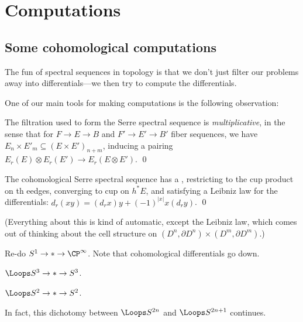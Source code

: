 
\chapter{Computations}




\section{Some cohomological computations}

The fun of spectral sequences in topology is that we don't just filter our problems away into differentials---we then try to compute the differentials.

One of our main tools for making computations is the following observation:
\begin{lemma}
The filtration used to form the Serre spectral sequence is \emph{multiplicative}, in the sense that for $F \to E \to B$ and $F' \to E' \to B'$ fiber sequences, we have $E_n \times E'_m \subseteq (E \times E')_{n+m}$, inducing a pairing $E_r(E) \otimes E_r(E') \to E_r(E \otimes E')$. \qed
\end{lemma}

\begin{corollary}
The cohomological Serre spectral sequence has a , restricting to the cup product on th eedges, converging to cup on $h^* E$, and satisfying a Leibniz law for the differentials: $d_r(x y) = (d_r x) y + (-1)^{|x|} x (d_r y)$. \qed
\end{corollary}

(Everything about this is kind of automatic, except the Leibniz law, which comes out of thinking about the cell structure on $(D^n, \partial D^n) \times (D^m, \partial D^m)$.)

\begin{example}
Re-do $S^1 \to * \to \CP^\infty$.  Note that cohomological differentials go down.
\end{example}

\begin{example}
$\Loops S^3 \to * \to S^3$.
\end{example}

\begin{example}
$\Loops S^2 \to * \to S^2$.
\end{example}

\begin{remark}
In fact, this dichotomy between $\Loops S^{2n}$ and $\Loops S^{2n+1}$ continues.
\end{remark}

